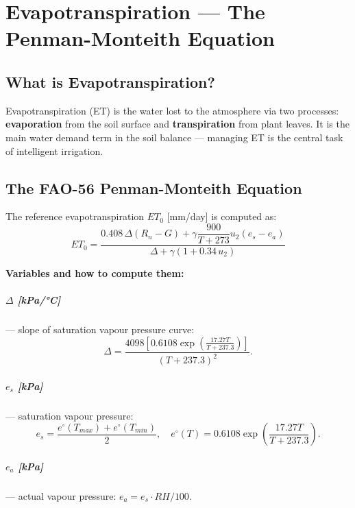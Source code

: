 \documentclass[12pt,a4paper,openany]{book}
\begin{document}
\chapter{Evapotranspiration — The Penman-Monteith Equation}
\label{chap:et}

\section{What is Evapotranspiration?}

Evapotranspiration (ET) is the water lost to the atmosphere via two processes: \textbf{evaporation} from the soil surface and \textbf{transpiration} from plant leaves. It is the main water demand term in the soil balance — managing ET is the central task of intelligent irrigation.

\section{The FAO-56 Penman-Monteith Equation}

The reference evapotranspiration $ET_0$ [mm/day] is computed as:
\begin{equation}
  \boxed{ET_0 = \frac{0.408\,\Delta(R_n-G)+\gamma\dfrac{900}{T+273}u_2(e_s-e_a)}{\Delta+\gamma(1+0.34\,u_2)}}
  \label{eq:PM}
\end{equation}

\textbf{Variables and how to compute them:}

\paragraph{$\Delta$ [kPa/°C]} — slope of saturation vapour pressure curve:
\begin{equation}
  \Delta = \frac{4098\left[0.6108\exp\!\left(\frac{17.27T}{T+237.3}\right)\right]}{(T+237.3)^2}.
\end{equation}

\paragraph{$e_s$ [kPa]} — saturation vapour pressure:
\begin{equation}
  e_s = \frac{e^{\circ}(T_{max})+e^{\circ}(T_{min})}{2},\quad
  e^{\circ}(T)=0.6108\exp\!\left(\frac{17.27T}{T+237.3}\right).
\end{equation}

\paragraph{$e_a$ [kPa]} — actual vapour pressure: $e_a=e_s\cdot RH/100$.
\end{document}
